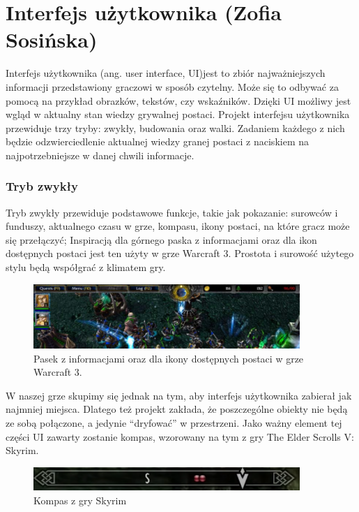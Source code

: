 \section{Interfejs użytkownika (Zofia Sosińska)}\label{chap:ui}
Interfejs użytkownika (ang. user interface, UI)jest to zbiór najważniejszych informacji przedstawiony graczowi w sposób czytelny. Może się to odbywać za pomocą na przykład obrazków, tekstów, czy wskaźników. Dzięki UI możliwy jest wgląd w aktualny stan wiedzy grywalnej postaci. 
Projekt interfejsu użytkownika przewiduje trzy tryby: zwykły, budowania oraz walki. Zadaniem każdego z nich będzie odzwierciedlenie aktualnej wiedzy granej postaci z naciskiem na najpotrzebniejsze w danej chwili informacje.
	
\subsubsection{Tryb zwykły}
Tryb zwykły przewiduje podstawowe funkcje, takie jak pokazanie:
surowców i funduszy,
aktualnego czasu w grze, 
kompasu,
ikony postaci, na które gracz może się przełączyć;
Inspiracją dla górnego paska z informacjami oraz dla ikon dostępnych postaci jest ten użyty w grze Warcraft 3. Prostota i surowość użytego stylu będą współgrać z klimatem gry.

\begin{figure}[htbp]
    \centering
    \includegraphics[width=0.9\textwidth]{images/ui/warcraft3.png}
    \caption{Pasek z informacjami oraz dla ikony dostępnych postaci w grze Warcraft 3.}\label{fig:Warcraft3}
\end{figure}

W naszej grze skupimy się jednak na tym, aby interfejs użytkownika zabierał jak najmniej miejsca. Dlatego też projekt zakłada, że poszczególne obiekty nie będą ze sobą połączone, a jedynie “dryfować” w przestrzeni.
Jako ważny element tej części UI zawarty zostanie kompas, wzorowany na tym z gry The Elder Scrolls V: Skyrim.

\begin{figure}[htbp]
    \centering
    \includegraphics[width=0.9\textwidth]{images/ui/compassSkyrim.png}
    \caption{Kompas z gry Skyrim}\label{fig:Fallout}
\end{figure}

